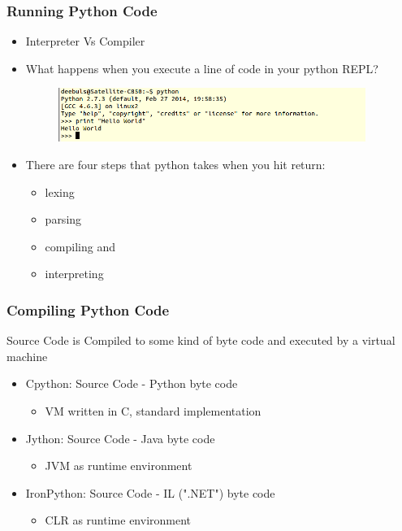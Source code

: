\documentclass{beamer}
\begin{document}
\begin{frame}
\frametitle{Running Python Code}
\begin{itemize}
\item Interpreter Vs Compiler

\item What happens when you execute a line of code in your python REPL?
	\begin{figure}
	\includegraphics[width=10cm]	{Interpreter.png}
	\end{figure}
\item There are four steps that python takes when you hit return:
	\begin{itemize}
	
	\item lexing
	\item parsing
	\item compiling and 
	\item interpreting
	\end{itemize}
\end{itemize}

  
\end{frame}


\begin{frame}
\frametitle{Compiling Python Code}
Source Code is Compiled to some kind of byte code and executed by a virtual machine
\begin{itemize}
\item Cpython: Source Code -  Python byte code
	\begin{itemize}
	\item VM written in C, standard implementation
	\end{itemize}
\item Jython: Source Code - Java byte code
	\begin{itemize}
	\item JVM as runtime environment
	\end{itemize}
\item IronPython: Source Code - IL (".NET") byte code
	\begin{itemize}
	\item CLR as runtime environment
	\end{itemize}
\end{itemize}

  
\end{frame}
\end{document}

